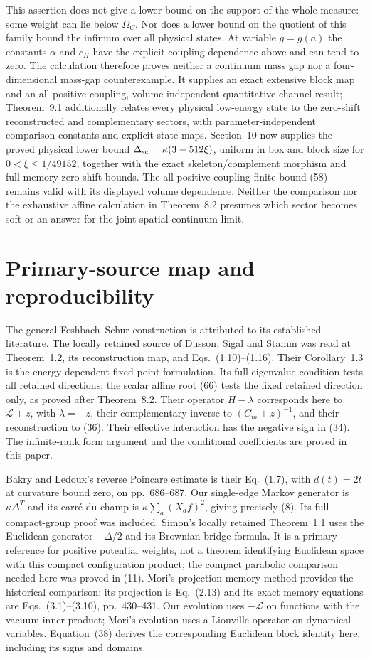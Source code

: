 \documentclass[11pt]{article}
\newcommand{\LL}{\mathscr L}
\begin{document}
This assertion does not give a lower bound on the support of the whole
measure: some weight can lie below $\Omega_C$. Nor does a lower bound
on the quotient of this family bound the infimum over all physical
states. At variable $g=g(a)$ the constants $\alpha$ and $c_H$ have the
explicit coupling dependence above and can tend to zero. The calculation
therefore proves neither a continuum mass gap nor a four-dimensional
mass-gap counterexample. It supplies an exact extensive block map and
an all-positive-coupling, volume-independent quantitative channel result;
Theorem~9.1 additionally relates every physical
low-energy state to the zero-shift reconstructed and complementary
sectors, with parameter-independent comparison constants and explicit
state maps. Section~10 now supplies the proved
physical lower bound $\Delta_{\rm sc}=\kappa(3-512\xi)$, uniform
in box and block size for $0<\xi\leq1/49152$, together with the
exact skeleton/complement morphism and full-memory zero-shift bounds.
The all-positive-coupling finite bound (58) remains
valid with its displayed volume dependence. Neither the comparison
nor the exhaustive affine calculation
in Theorem~8.2 presumes which sector becomes soft or an
answer for the joint spatial continuum limit.

\section{Primary-source map and reproducibility}

The general Feshbach--Schur construction is attributed to its established
literature. The locally retained source of Dusson, Sigal and Stamm was
read at Theorem~1.2, its reconstruction map, and Eqs.~(1.10)--(1.16).
Their Corollary~1.3 is the energy-dependent fixed-point formulation.
Its full eigenvalue condition tests all retained directions; the
scalar affine root (66) tests the fixed retained
direction only, as proved after Theorem~8.2.
Their operator $H-\lambda$ corresponds here to $\LL+z$, with
$\lambda=-z$, their complementary inverse to $(C_m+z)^{-1}$, and
their reconstruction to (36). Their effective
interaction has the negative sign in (34). The infinite-rank
form argument and the conditional coefficients are proved in this paper.

Bakry and Ledoux's reverse Poincare estimate is their Eq.~(1.7), with
$d(t)=2t$ at curvature bound zero, on pp.~686--687. Our single-edge
Markov generator is $\kappa\Delta^T$ and its carré du champ is
$\kappa\sum_a(X_af)^2$, giving precisely (8). Its full
compact-group proof was included. Simon's locally retained Theorem~1.1
uses the Euclidean generator $-\Delta/2$ and its Brownian-bridge formula.
It is a primary reference for positive potential weights, not a theorem
identifying Euclidean space with this compact configuration product;
the compact parabolic comparison needed here was proved in
(11). Mori's projection-memory method provides the
historical comparison: its projection is Eq.~(2.13) and its exact
memory equations are Eqs.~(3.1)--(3.10), pp.~430--431.
Our evolution uses $-\LL$ on functions with the vacuum inner product;
Mori's evolution uses a Liouville operator on dynamical variables.
Equation~(38) derives the corresponding Euclidean block
identity here, including its signs and domains.
\end{document}
